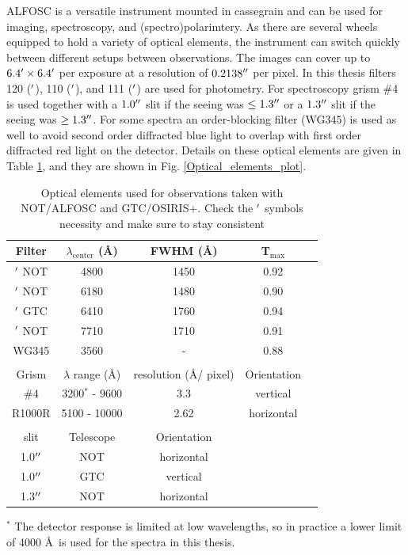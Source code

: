 \documentclass[a4paper,oneside,12pt, class=Latex/Classes/PhDthesisPSnPDF, crop=false]{standalone}
\begin{document}
ALFOSC is a versatile instrument mounted in cassegrain and can be used for imaging, spectroscopy, and (spectro)polarimtery. As there are several wheels equipped to hold a variety of optical elements, the instrument can switch quickly between different setups between observations. The images can cover up to $6.4^{\prime}\times6.4^{\prime}$ per exposure at a resolution of $0.2138^{\prime\prime}$ per pixel. In this thesis filters 120 (\ztfg$^{\prime}$), 110 (\ztfr$^{\prime}$), and 111 (\ztfi$^{\prime}$) are used for photometry. For spectroscopy grism \#4 is used together with a $1.0^{\prime\prime}$ slit if the seeing was $\leq1.3^{\prime\prime}$ or a  $1.3^{\prime\prime}$ slit if the seeing was $\geq1.3^{\prime\prime}$. For some spectra an order-blocking filter (WG345) is used as well to avoid second order diffracted blue light to overlap with first order diffracted red light on the detector. Details on these optical elements are given in Table \ref{NOT_optic_elems}, and they are shown in Fig. \ref{Optical_elements_plot}.

\begin{table}
    \centering
    \caption{Optical elements used for observations taken with NOT/ALFOSC and GTC/OSIRIS+. \color{red} Check the $^{\prime}$ symbols necessity and make sure to stay consistent \color{black}}
    	\begin{tabular}{ccccc}
    		\hline
    		\hline
    		Filter & $\lambda_\text{center}$ (\AA) & FWHM (\AA) & T$_\text{max}$\\
    		\hline
    		\ztfg$^{\prime}$ NOT & 4800 & 1450 & 0.92\\
    		\ztfr$^{\prime}$ NOT & 6180 & 1480 & 0.90\\
    		\ztfr$^{\prime}$ GTC & 6410 & 1760 & 0.94\\
    		\ztfi$^{\prime}$ NOT & 7710 & 1710 & 0.91\\
    		WG345 & 3560 & - & 0.88\\
    		\\
    		\hline
    		\hline
    		Grism & $\lambda$ range (\AA) & resolution (\AA / pixel) & Orientation\\
    		\hline
    		\#4 & 3200$^*$ - 9600 & 3.3 & vertical\\
    		R1000R & 5100 - 10000 & 2.62 & horizontal\\
    		\\
    		\hline
    		\hline
    		slit & Telescope & Orientation\\
    		\hline
    		1.0$^{\prime\prime}$ & NOT & horizontal & \\
    		1.0$^{\prime\prime}$ & GTC & vertical & \\
    		1.3$^{\prime\prime}$ & NOT & horizontal & \\
    		\hline
    	\end{tabular}
    \begin{flushleft}
    	$^*$ The detector response is limited at low wavelengths, so in practice a lower limit of 4000 \AA\ is used for the spectra in this thesis.
    \end{flushleft}
    \label{NOT_optic_elems}
\end{table}
\end{document}
